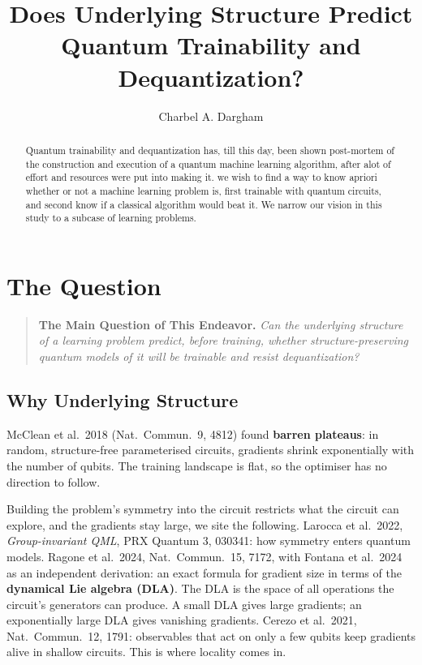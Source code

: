 \documentclass[10pt,a4paper]{article}
\title{\large\bfseries Does Underlying Structure Predict\\ Quantum Trainability and Dequantization?}
\author{\normalsize Charbel A. Dargham}
\date{}
\begin{document}
\maketitle

\begin{abstract}
\noindent Quantum trainability and dequantization has, till this day, been shown
post-mortem of the construction and execution of a quantum machine learning
algorithm, after alot of effort and resources were put into making it. we
wish to find a way to know apriori whether or not a machine learning problem
is, first trainable with quantum circuits, and second know if a classical
algorithm would beat it. We narrow our vision in this study to a subcase of
learning problems.
\end{abstract}

\section{The Question}

\begin{quote}
\textbf{The Main Question of This Endeavor.}
\emph{Can the underlying structure of a learning problem predict, before training,
whether structure-preserving quantum models of it will be trainable and
resist dequantization?}
\end{quote}

\subsection{Why Underlying Structure}

McClean et al.\ 2018 (Nat.\ Commun.\ 9, 4812) found \textbf{barren plateaus}:
in random, structure-free parameterised circuits, gradients shrink
exponentially with the number of qubits. The training landscape is flat, so
the optimiser has no direction to follow.

Building the problem's symmetry into the circuit restricts what the circuit
can explore, and the gradients stay large, we site the following.
Larocca et al.\ 2022, \emph{Group-invariant QML}, PRX Quantum 3,
030341: how symmetry enters quantum models.
Ragone et al.\ 2024, Nat.\ Commun.\ 15, 7172, with Fontana et al.\ 2024 as
an independent derivation: an exact formula for gradient size in terms of
the \textbf{dynamical Lie algebra (DLA)}. The DLA is the space of all
operations the circuit's generators can produce. A small DLA gives large
gradients; an exponentially large DLA gives vanishing gradients.
Cerezo et al.\ 2021, Nat.\ Commun.\ 12, 1791: observables that act on
only a few qubits keep gradients alive in shallow circuits. This is where
locality comes in.
\end{document}
